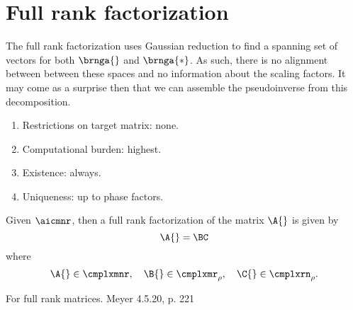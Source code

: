 \section{Full rank factorization}
The full rank factorization uses Gaussian reduction to find a spanning set of vectors for both $\brnga{}$ and $\brnga{*}$. As such, there is no alignment between between these spaces and no information about the scaling factors. It may come as a surprise then that we can assemble the pseudoinverse from this decomposition.

\begin{enumerate}
%
  \item Restrictions on target matrix: none.
%
  \item Computational burden: highest.
%
  \item Existence: always.
%
  \item Uniqueness: up to phase factors.
%
\end{enumerate}

Given $\aicmnr$, then a full rank factorization \cite[p. 633]{Meyer2000} of the matrix $\A{}$ is given by
\begin{equation}
  \A{} = \BC
  \label{eq:pantheon:full rank}
\end{equation}
where 
%
\begin{equation}
  \A{} \in \cmplxmnr, \quad \B{} \in \cmplxmr_{\rho}, \quad \C{} \in \cmplxrn_{\rho}. \\
\end{equation}

For full rank matrices. Meyer 4.5.20, p. 221

